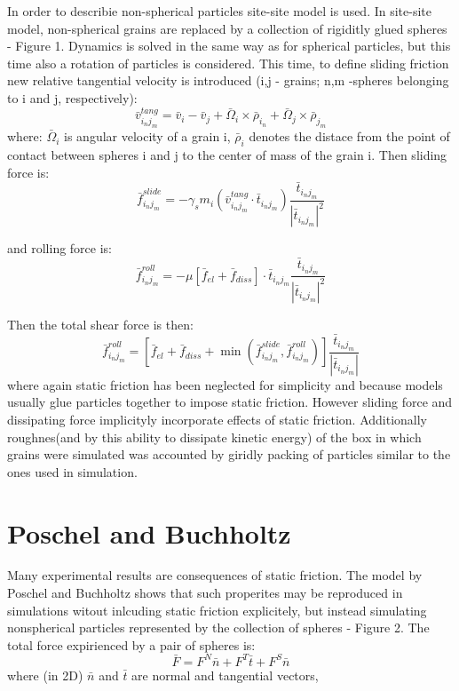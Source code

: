 \documentclass[10pt,a4paper]{article}
\begin{document}
In order to describie non-spherical particles site-site model is used. In site-site model, non-spherical
grains are replaced by a collection of rigiditly glued spheres - Figure 1.
Dynamics is solved in the same way as for spherical particles, but this time also a rotation of particles is considered. 
This time, to define sliding friction new relative tangential velocity is introduced 
(i,j - grains; n,m -spheres belonging to i and j, respectively):
\begin{equation}
 \bar{v}^{tang}_{i_{n}j_{m}} = \bar{v}_{i} - \bar{v}_{j} + \bar{\Omega}_{i} \times \bar{\rho}_{i_{n}} + \bar{\Omega}_j \times \bar{\rho}_{j_{m}}
\end{equation}
where: $\bar{\Omega}_i$ is angular velocity of a grain i, $\bar{\rho}_i$ denotes the distace from the point of contact
between spheres i and j to the center of mass of the grain i.
Then sliding force is:
\begin{equation}
 \bar{f}^{slide}_{i_{n}j_{m}} = -\gamma_s m_i (\bar{v}^{tang}_{i_{n}j_{m}}\cdot \bar{t}_{i_{n}j_{m}}) \frac{ \bar{t}_{i_{n}j_{m}} } { |\bar{t}_{i_{n}j_{m}}|^2 }
\end{equation}

and rolling force is:
\begin{equation}
 \bar{f}^{roll}_{i_{n}j_{m}} = -\mu [\bar{f}_{el} + \bar{f}_{diss}] \cdot \bar{t}_{i_{n}j_{m}} \frac{ \bar{t}_{i_{n}j_{m}} } { |\bar{t}_{i_{n}j_{m}}|^2 }
\end{equation}

Then the total shear force is then:
\begin{equation}
 \bar{f}^{roll}_{i_{n}j_{m}} = [\bar{f}_{el} + \bar{f}_{diss} + \min(\bar{f}^{slide}_{i_{n}j_{m}}, \bar{f}^{roll}_{i_{n}j_{m}})]  \frac{ \bar{t}_{i_{n}j_{m}} } { |\bar{t}_{i_{n}j_{m}}| }
\end{equation}
where again static friction has been neglected for simplicity and because models usually glue particles together to impose static friction.
However sliding force and dissipating force implicityly incorporate effects of static friction.
Additionally roughnes(and by this ability to dissipate kinetic energy) 
of the box in which grains were simulated was accounted by giridly packing of particles similar to the ones used in simulation.

\section{Poschel and Buchholtz \cite{pb93, pb94, pb95}}
Many experimental results are consequences of static friction. The model by Poschel and Buchholtz 
shows that such properites may be reproduced in simulations witout inlcuding static friction explicitely,
but instead simulating nonspherical particles represented by the collection of spheres - Figure 2. 
The total force expirienced by a pair of spheres is:
\begin{equation}
 \bar{F} = F^{N} \bar{n} + F^{T} \bar{t} + F^{S} \bar{n}
\end{equation}
where (in 2D) $\bar{n}$ and $\bar{t}$ are normal and tangential vectors,
\end{document}
